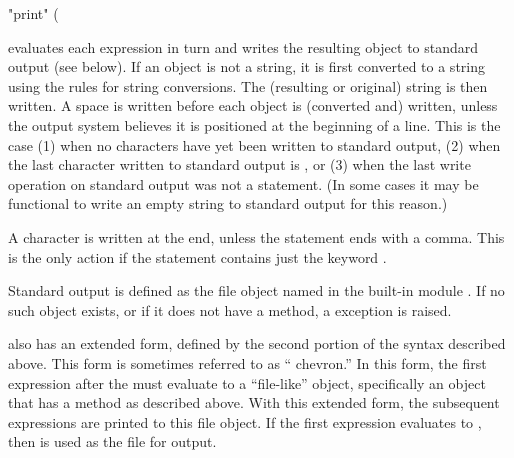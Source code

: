 \begin{productionlist}
             {"print" ( }
\end{productionlist}

 evaluates each expression in turn and writes the
resulting object to standard output (see below).  If an object is not
a string, it is first converted to a string using the rules for string
conversions.  The (resulting or original) string is then written.  A
space is written before each object is (converted and) written, unless
the output system believes it is positioned at the beginning of a
line.  This is the case (1) when no characters have yet been written
to standard output, (2) when the last character written to standard
output is , or (3) when the last write operation on
standard output was not a  statement.  (In some cases
it may be functional to write an empty string to standard output for
this reason.)  

A  character is written at the end, unless the
 statement ends with a comma.  This is the only action
if the statement contains just the keyword .

Standard output is defined as the file object named 
in the built-in module .  If no such object exists, or if
it does not have a  method, a 
exception is raised.

 also has an extended
form, defined by the second portion of the syntax described above.
This form is sometimes referred to as `` chevron.''
In this form, the first expression after the \code{>}\code{>} must
evaluate to a ``file-like'' object, specifically an object that has a
 method as described above.  With this extended form,
the subsequent expressions are printed to this file object.  If the
first expression evaluates to , then  is
used as the file for output.


